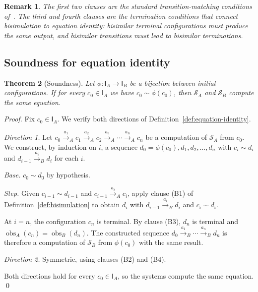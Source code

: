 \documentclass[twocolumn,11pt,a4paper]{article}
\newtheorem{theorem}{Theorem}[section]
\newtheorem{remark}[theorem]{Remark}
\DeclareMathOperator{\obs}{obs}
\newcommand{\Init}{\mathsf{I}}
\newcommand{\Sys}{\mathcal{S}}
\newcommand{\bisim}{\sim}
\begin{document}
\begin{remark}
The first two clauses are the standard transition-matching conditions of~\citet{park1981,milner1989}. The third and fourth clauses are the termination conditions that connect bisimulation to equation identity: bisimilar terminal configurations must produce the same output, and bisimilar transitions must lead to bisimilar terminations.
\end{remark}

\subsection{Soundness for equation identity}

\begin{theorem}[Soundness]
\label{thm:soundness}
Let $\phi : \Init_A \to \Init_B$ be a bijection between initial configurations. If for every $c_0 \in \Init_A$ we have $c_0 \bisim \phi(c_0)$, then $\Sys_A$ and $\Sys_B$ compute the same equation.
\end{theorem}

\begin{proof}
Fix $c_0 \in \Init_A$. We verify both directions of Definition~\ref{def:equation-identity}.

\emph{Direction 1.} Let $c_0 \xrightarrow{a_1}_A c_1 \xrightarrow{a_2}_A c_2 \xrightarrow{a_3}_A \cdots \xrightarrow{a_n}_A c_n$ be a computation of $\Sys_A$ from $c_0$. We construct, by induction on $i$, a sequence $d_0 = \phi(c_0), d_1, d_2, \ldots, d_n$ with $c_i \bisim d_i$ and $d_{i-1} \xrightarrow{a_i}_B d_i$ for each $i$.

\emph{Base.} $c_0 \bisim d_0$ by hypothesis.

\emph{Step.} Given $c_{i-1} \bisim d_{i-1}$ and $c_{i-1} \xrightarrow{a_i}_A c_i$, apply clause (B1) of Definition~\ref{def:bisimulation} to obtain $d_i$ with $d_{i-1} \xrightarrow{a_i}_B d_i$ and $c_i \bisim d_i$.

At $i = n$, the configuration $c_n$ is terminal. By clause (B3), $d_n$ is terminal and $\obs_A(c_n) = \obs_B(d_n)$. The constructed sequence $d_0 \xrightarrow{a_1}_B \cdots \xrightarrow{a_n}_B d_n$ is therefore a computation of $\Sys_B$ from $\phi(c_0)$ with the same result.

\emph{Direction 2.} Symmetric, using clauses (B2) and (B4).

Both directions hold for every $c_0 \in \Init_A$, so the systems compute the same equation. \qed
\end{proof}
\end{document}
